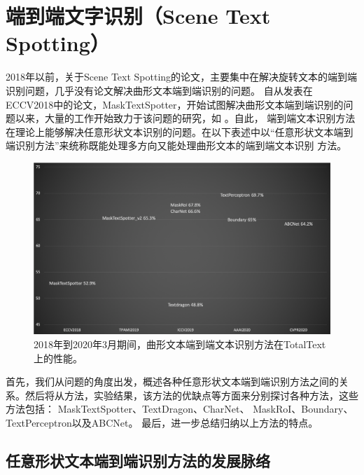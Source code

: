 % 
\chapter{端到端文字识别（Scene Text Spotting）}


2018年以前，关于Scene Text Spotting的论文\cite{liu2018fots}，主要集中在解决旋转文本的端到端识别问题，几乎没有论文解决曲形文本端到端识别的问题。
自从发表在ECCV2018中的论文，MaskTextSpotter\cite{lyu2018mask}，开始试图解决曲形文本端到端识别的问题以来，大量的工作开始致力于该问题的研究，如
\cite{lyu2018mask,liao2019mask,Feng_2019_ICCV,Xing_2019_ICCV,qin2019towards,wang2019all,liu2020abcnet,qiao2020text}。自此，
端到端文本识别方法在理论上能够解决任意形状文本识别的问题。在以下表述中以“任意形状文本端到端识别方法”来统称既能处理多方向又能处理曲形文本的端到端文本识别
方法。

\begin{figure}[H]
    \centering
    \includegraphics[width=.98\textwidth]{figure/spotting/trends.png} 
    \caption{2018年到2020年3月期间，曲形文本端到端文本识别方法在TotalText上的性能。} 
    \label{spotting_tends} 
\end{figure}

首先，我们从问题的角度出发，概述各种任意形状文本端到端识别方法之间的关系。然后将从方法，实验结果，该方法的优缺点等方面来分别探讨各种方法，这些方法包括：
MaskTextSpotter\cite{lyu2018mask,liao2019mask}、TextDragon\cite{Feng_2019_ICCV}、CharNet\cite{Xing_2019_ICCV}、
MaskRoI\cite{qin2019towards}、Boundary\cite{wang2019all}、TextPerceptron\cite{qiao2020text}以及ABCNet\cite{liu2020abcnet}。
最后，进一步总结归纳以上方法的特点。



\section{任意形状文本端到端识别方法的发展脉络}



